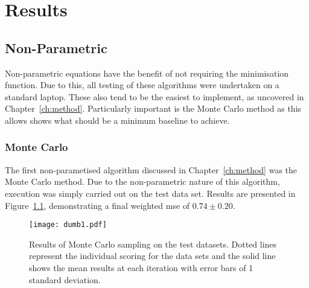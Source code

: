 \chapter{Results}


\graphicspath{{Chapter4/Figs/Vector/}{Chapter4/Figs/}}

\section{Non-Parametric}
Non-parametric equations have the benefit of not requiring the minimisation function. Due to this, all testing of these algorithms were undertaken on a standard laptop. These also tend to be the easiest to implement, as uncovered in Chapter~\ref{ch:method}. Particularly important is the Monte Carlo method as this allows shows what should be a minimum baseline to achieve.

\subsection{Monte Carlo}
The first non-parametised algorithm discussed in Chapter~\ref{ch:method} was the Monte Carlo method. Due to the non-parametric nature of this algorithm, execution was simply carried out on the test data set. Results are presented in Figure~\ref{fig:MCTestSet}, demonstrating a final weighted mse of ${0.74\pm{}0.20}$.
\begin{figure}[h]
    \begin{center}
        \texttt{[image: dumb1.pdf]}
        \caption[Monte Carlo]{Results of Monte Carlo sampling on the test datasets. Dotted lines represent the individual scoring for the data sets and the solid line shows the mean results at each iteration with error bars of 1 standard deviation.}
        \label{fig:MCTestSet}
    \end{center}
\end{figure}

